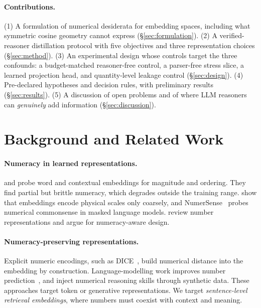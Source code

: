 \documentclass[11pt]{article}
\begin{document}
\paragraph{Contributions.} (1) A formulation of numerical desiderata for embedding spaces, including what symmetric
cosine geometry cannot express (\S\ref{sec:formulation}). (2) A verified-reasoner distillation protocol with five
objectives and three representation choices (\S\ref{sec:method}). (3) An experimental design whose controls target
the three confounds: a budget-matched reasoner-free control, a parser-free stress slice, a learned projection head, and
quantity-level leakage control (\S\ref{sec:design}). (4) Pre-declared hypotheses and decision rules, with preliminary
results (\S\ref{sec:results}). (5) A discussion of open problems and of where LLM reasoners can \emph{genuinely} add
information (\S\ref{sec:discussion}).

\section{Background and Related Work}
\paragraph{Numeracy in learned representations.} \citet{naik2019numeracy} and \citet{wallace2019numbers} probe word
and contextual embeddings for magnitude and ordering. They find partial but brittle numeracy, which degrades outside
the training range. \citet{zhang2020scales} show that embeddings encode physical scales only coarsely, and
NumerSense~\cite{lin2020numersense} probes numerical commonsense in masked language models. \citet{thawani2021survey}
review number representations and argue for numeracy-aware design.

\paragraph{Numeracy-preserving representations.} Explicit numeric encodings, such as DICE~\cite{sundararaman2020dice},
build numerical distance into the embedding by construction. Language-modelling work improves number
prediction~\cite{spithourakis2018numeracy}, and \citet{geva2020injecting} inject numerical reasoning skills through
synthetic data. These approaches target token or generative representations. We target \emph{sentence-level
retrieval embeddings}, where numbers must coexist with context and meaning.
\end{document}
